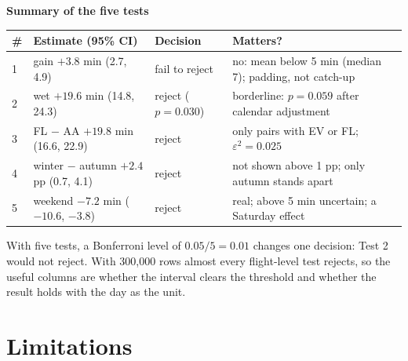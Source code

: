 \documentclass[10pt,a4paper,twocolumn]{article}
\newcommand{\egblock}[1]{{\color{eg}#1\par}}
\newcommand{\minihead}[1]{\par\needspace{8\baselineskip}\smallskip\textbf{#1}\par}
\begin{document}
\minihead{Summary of the five tests}
{\footnotesize
\begin{tabularx}{\linewidth}{@{}L{0.3cm} L{2.4cm} L{1.4cm} Y@{}}
\toprule
\textbf{\#} & \textbf{Estimate (95\% CI)} & \textbf{Decision} & \textbf{Matters?} \\
 & gain $+3.8$ min (2.7, 4.9) & fail to reject & no: mean below 5 min (median 7); padding, not
catch-up \\
2 & wet $+19.6$ min (14.8, 24.3) & reject ($p=0.030$) & borderline: $p=0.059$ after calendar
adjustment \\
3 & FL $-$ AA $+19.8$ min (16.6, 22.9) & reject & only pairs with EV or FL; $\varepsilon^2=0.025$ \\
4 & winter $-$ autumn $+2.4$ pp (0.7, 4.1) & reject & not shown above 1 pp; only autumn stands
apart \\
5 & weekend $-7.2$ min ($-10.6$, $-3.8$) & reject & real; above 5 min uncertain; a Saturday
effect \\
\bottomrule
\end{tabularx}}

\egblock{With five tests, a Bonferroni level of $0.05/5=0.01$ changes one decision: Test 2 would
not reject. With 300{,}000 rows almost every flight-level test rejects, so the useful columns are
whether the interval clears the threshold and whether the result holds with the day as the unit.}

\section{Limitations}
\end{document}
